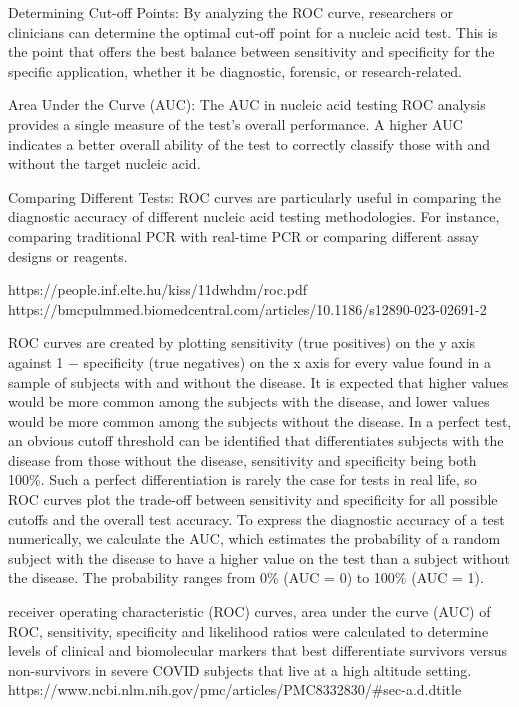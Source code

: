\documentclass{article}\usepackage[]{graphicx}\usepackage[]{xcolor}
\numberwithin{equation}{section}
\begin{document}
Determining Cut-off Points: By analyzing the ROC curve, researchers or clinicians can determine the optimal cut-off point for a nucleic acid test. This is the point that offers the best balance between sensitivity and specificity for the specific application, whether it be diagnostic, forensic, or research-related.

Area Under the Curve (AUC): The AUC in nucleic acid testing ROC analysis provides a single measure of the test's overall performance. A higher AUC indicates a better overall ability of the test to correctly classify those with and without the target nucleic acid.

Comparing Different Tests: ROC curves are particularly useful in comparing the diagnostic accuracy of different nucleic acid testing methodologies. For instance, comparing traditional PCR with real-time PCR or comparing different assay designs or reagents.

https://people.inf.elte.hu/kiss/11dwhdm/roc.pdf
https://bmcpulmmed.biomedcentral.com/articles/10.1186/s12890-023-02691-2


ROC curves are created by plotting sensitivity (true positives) on the y axis against 1 − specificity (true negatives) on the x axis for every value found in a sample of subjects with and without the disease. It is expected that higher values would be more common among the subjects with the disease, and lower values would be more common among the subjects without the disease. In a perfect test, an obvious cutoff threshold can be identified that differentiates subjects with the disease from those without the disease, sensitivity and specificity being both 100\%. Such a perfect differentiation is rarely the case for tests in real life, so ROC curves plot the trade-off between sensitivity and specificity for all possible cutoffs and the overall test accuracy. To express the diagnostic accuracy of a test numerically, we calculate the AUC, which estimates the probability of a random subject with the disease to have a higher value on the test than a subject without the disease. The probability ranges from 0\% (AUC = 0) to 100\% (AUC = 1).

receiver operating characteristic (ROC) curves, area under the curve (AUC) of ROC, sensitivity, specificity and likelihood ratios were calculated to determine levels of clinical and biomolecular markers that best differentiate survivors versus non-survivors in severe COVID subjects that live at a high altitude setting.
https://www.ncbi.nlm.nih.gov/pmc/articles/PMC8332830/#sec-a.d.dtitle
\end{document}
